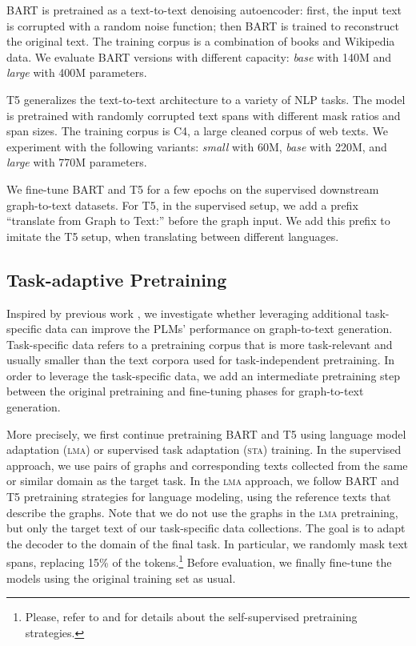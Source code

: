 \documentclass[11pt,a4paper]{article}
\begin{document}
BART is pretrained as a text-to-text denoising autoencoder: first, the input text is corrupted with a random noise function; then BART is trained to reconstruct the original text. The training corpus is a combination of books and Wikipedia data. We evaluate BART versions with different capacity: \emph{base} with 140M and \emph{large} with 400M parameters. 

T5 generalizes the text-to-text architecture to a variety of NLP tasks. The model is pretrained with randomly corrupted text spans with different mask ratios and span sizes. The training corpus is C4, a large cleaned corpus of web texts. We experiment with the following variants: \emph{small} with 60M, \emph{base} with 220M, and \emph{large} with 770M parameters.

We fine-tune BART and T5 for a few epochs on the supervised downstream graph-to-text datasets. For T5, in the supervised setup, we add a prefix ``translate from Graph to Text:'' before the graph input. We add this prefix to imitate the T5 setup, when translating between different languages. 







\subsection{Task-adaptive Pretraining} 
\label{sec:domainpretraining}



Inspired by previous work \cite{konsas_17,gururangan-etal-2020-dont}, we investigate whether leveraging additional task-specific data can improve the PLMs' performance on graph-to-text generation. Task-specific data refers to a pretraining corpus that is more task-relevant and usually smaller than the text corpora used for task-independent pretraining. In order to leverage the task-specific data, we add an intermediate pretraining step between the original pretraining and fine-tuning phases for graph-to-text generation. 



More precisely, we first continue pretraining BART and T5 using language model adaptation (\textsc{lma}) or supervised task adaptation (\textsc{sta}) training. In the supervised approach, we use pairs of graphs and corresponding texts collected from the same or similar domain as the target task. In the \textsc{lma} approach, we follow BART and T5 pretraining strategies for language modeling, using the reference texts that describe the graphs. Note that we do not use the graphs in the \textsc{lma} pretraining, but only the target text of our task-specific data collections. The goal is to adapt the decoder to the domain of the final task. In particular, we randomly mask text spans, replacing 15\% of the tokens.\footnote{Please, refer to \citet{lewis2019bart} and \citet{2019t5} for details about the self-supervised pretraining strategies.}
Before evaluation, we finally fine-tune the models using the original training set as usual.
\end{document}
